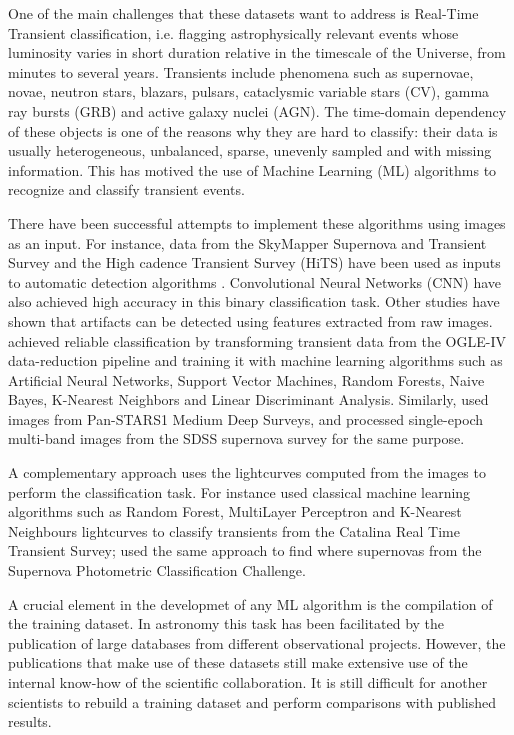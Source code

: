 \documentclass[a4paper,fleqn,usenatbib]{mnras}
\begin{document}
One of the main challenges that these datasets want to address is
Real-Time Transient classification, i.e. flagging astrophysically
relevant events whose luminosity varies in short duration relative in
the timescale of the Universe, from minutes to several years.  
Transients include phenomena such as supernovae, novae, neutron
stars, blazars, pulsars, cataclysmic variable stars (CV), gamma ray
bursts (GRB) and active galaxy nuclei (AGN). 
The time-domain dependency of these objects is one of the reasons why
they are hard to classify: their data is usually heterogeneous,
unbalanced, sparse, unevenly sampled and with missing information. 
This has motived the use of Machine Learning (ML) algorithms to recognize
and classify transient events. 


There have been successful attempts to implement these algorithms
using images as an input.
For instance, data from the SkyMapper Supernova and Transient
Survey and the High cadence Transient Survey (HiTS) have been used as
inputs to automatic detection algorithms \citep{1708.08947,1701.00458}.
Convolutional Neural Networks (CNN) have also achieved
high accuracy in this binary classification task.
Other studies have shown that artifacts can be detected using
features extracted from raw images. 
\cite{1601.06320} achieved reliable
classification by transforming transient data from the OGLE-IV
data-reduction pipeline and training it with machine learning
algorithms such as Artificial Neural Networks, Support Vector
Machines, Random Forests, Naive Bayes, K-Nearest Neighbors and Linear
Discriminant Analysis.  
Similarly, \cite{1501.05470} used images from Pan-STARS1 Medium Deep
Surveys, and \cite{1407.4118} processed single-epoch multi-band images
from the SDSS supernova survey for the same purpose.  


A complementary approach uses the lightcurves computed from the
images to perform the classification task.
For instance \cite{1601.03931} used classical machine learning
algorithms such as Random Forest, MultiLayer Perceptron and K-Nearest Neighbours
lightcurves to classify transients from the Catalina Real Time
Transient Survey; \cite{1603.00882} used the same approach to find
where supernovas from the Supernova Photometric Classification
Challenge.

A crucial element in the developmet of any ML algorithm is the
compilation of the training dataset. 
In astronomy this task has been facilitated by the publication of
large databases from different observational projects. 
However, the publications that make use of these datasets still make
extensive use of the internal know-how of the scientific
collaboration. 
It is still difficult for another scientists to rebuild a training
dataset and perform comparisons with published results.
\end{document}
